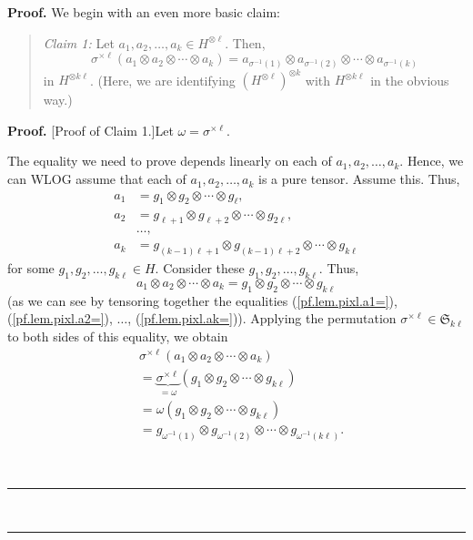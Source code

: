 \documentclass[numbers=enddot,12pt,final,onecolumn,notitlepage]{scrartcl}%
\theoremstyle{definition}
\newenvironment{statement}{\begin{quote}}{\end{quote}}
\newenvironment{proof}[1][Proof]{\noindent\textbf{#1.} }{\ \rule{0.5em}{0.5em}}
\begin{document}
\begin{proof}
We begin with an even more basic claim:

\begin{statement}
\textit{Claim 1:} Let $a_{1},a_{2},\ldots,a_{k}\in H^{\otimes\ell}$. Then,%
\[
\sigma^{\times\ell}\left(  a_{1}\otimes a_{2}\otimes\cdots\otimes
a_{k}\right)  =a_{\sigma^{-1}\left(  1\right)  }\otimes a_{\sigma^{-1}\left(
2\right)  }\otimes\cdots\otimes a_{\sigma^{-1}\left(  k\right)  }%
\]
in $H^{\otimes k\ell}$. (Here, we are identifying $\left(  H^{\otimes\ell
}\right)  ^{\otimes k}$ with $H^{\otimes k\ell}$ in the obvious way.)
\end{statement}

\begin{proof}
[Proof of Claim 1.]Let $\omega=\sigma^{\times\ell}$.

The equality we need to prove depends linearly on each of $a_{1},a_{2}%
,\ldots,a_{k}$. Hence, we can WLOG assume that each of $a_{1},a_{2}%
,\ldots,a_{k}$ is a pure tensor. Assume this. Thus,%
\begin{align}
a_{1}  &  =g_{1}\otimes g_{2}\otimes\cdots\otimes g_{\ell}%
,\label{pf.lem.pixl.a1=}\\
a_{2}  &  =g_{\ell+1}\otimes g_{\ell+2}\otimes\cdots\otimes g_{2\ell
},\label{pf.lem.pixl.a2=}\\
&  \ldots,\nonumber\\
a_{k}  &  =g_{\left(  k-1\right)  \ell+1}\otimes g_{\left(  k-1\right)
\ell+2}\otimes\cdots\otimes g_{k\ell} \label{pf.lem.pixl.ak=}%
\end{align}
for some $g_{1},g_{2},\ldots,g_{k\ell}\in H$. Consider these $g_{1}%
,g_{2},\ldots,g_{k\ell}$. Thus,%
\[
a_{1}\otimes a_{2}\otimes\cdots\otimes a_{k}=g_{1}\otimes g_{2}\otimes
\cdots\otimes g_{k\ell}%
\]
(as we can see by tensoring together the equalities (\ref{pf.lem.pixl.a1=}),
(\ref{pf.lem.pixl.a2=}), $\ldots$, (\ref{pf.lem.pixl.ak=})). Applying the
permutation $\sigma^{\times\ell}\in\mathfrak{S}_{k\ell}$ to both sides of this
equality, we obtain%
\begin{align}
&  \sigma^{\times\ell}\left(  a_{1}\otimes a_{2}\otimes\cdots\otimes
a_{k}\right) \nonumber\\
&  =\underbrace{\sigma^{\times\ell}}_{=\omega}\left(  g_{1}\otimes
g_{2}\otimes\cdots\otimes g_{k\ell}\right) \nonumber\\
&  =\omega\left(  g_{1}\otimes g_{2}\otimes\cdots\otimes g_{k\ell}\right)
\nonumber\\
&  =g_{\omega^{-1}\left(  1\right)  }\otimes g_{\omega^{-1}\left(  2\right)
}\otimes\cdots\otimes g_{\omega^{-1}\left(  k\ell\right)  }.
\label{pf.lem.pixl.1}%
\end{align}



\end{proof}
\end{proof}
\end{document}
